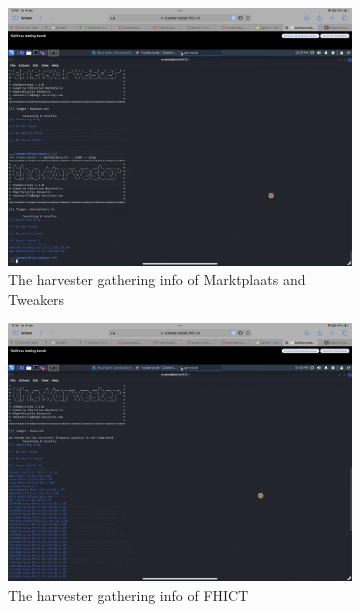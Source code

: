 \documentclass[12pt, letterpaper]{article}
\begin{document}
\begin{figure}[!ht]
    \begin{subfigure}{0.45\textwidth}
        \centering
        \includegraphics[width=0.9\linewidth]{PDFs/Week 2/The harvester marktplaats tweakers.png}
        \caption{The harvester gathering info of Marktplaats and Tweakers}
    \end{subfigure}
    \begin{subfigure}{0.45\textwidth}
        \centering
        \includegraphics[width=0.9\linewidth]{PDFs/Week 2/Theharvest-fhict.png}
        \caption{The harvester gathering info of FHICT}
    \end{subfigure}
    \begin{subfigure}{0.45\textwidth}
        \centering

\end{subfigure}
\end{figure}
\end{document}
